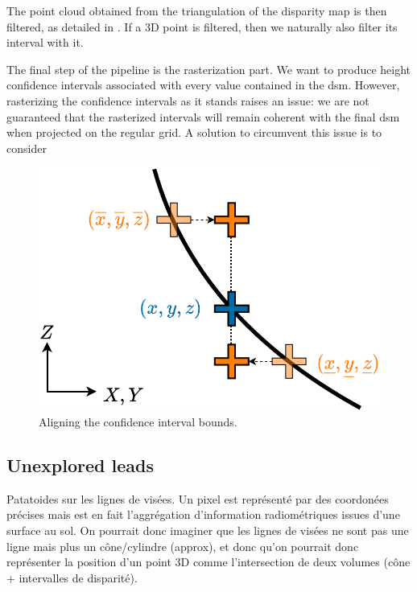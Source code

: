 The point cloud obtained from the triangulation of the disparity map is then filtered, as detailed in . If a 3D point is filtered, then we naturally also filter its interval with it. 

The final step of the pipeline is the rasterization part. We want to produce height confidence intervals associated with every value contained in the \acrshort{dsm}. However, rasterizing the confidence intervals as it stands raises an issue: we are not guaranteed that the rasterized intervals will remain coherent with the final \acrshort{dsm} when projected on the regular grid. A solution to circumvent this issue is to consider 

\begin{figure}
    \centering
    \includegraphics[width=\linewidth]{Images/Chap_5/Planimetric_shift.png}
    \caption{Aligning the confidence interval bounds.}
    \label{fig:planimetric_shift}
\end{figure}

\subsection{Unexplored leads}
Patatoides sur les lignes de visées. Un pixel est représenté par des coordonées précises mais est en fait l'aggrégation d'information radiométriques issues d'une surface au sol. On pourrait donc imaginer que les lignes de visées ne sont pas une ligne mais plus un cône/cylindre (approx), et donc qu'on pourrait donc représenter la position d'un point 3D comme l'intersection de deux volumes (cône + intervalles de disparité).   

